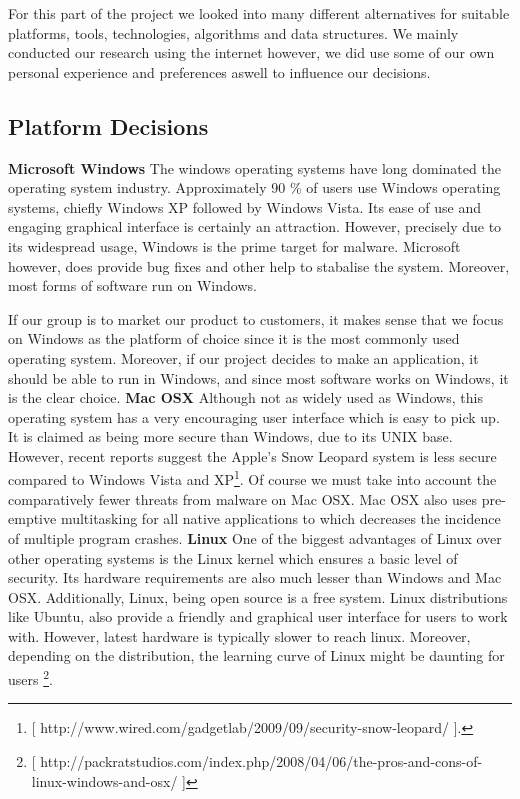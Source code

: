 
For this part of the project we looked into many different alternatives for suitable platforms,
tools, technologies, algorithms and data structures. We mainly conducted our research using the internet however, 
we did use some of our own personal experience and preferences aswell to influence our decisions.

\subsection{Platform Decisions}
\vspace{5 mm}
\textbf{Microsoft Windows}
\newline
\newline
The windows operating systems have long dominated the operating system industry. Approximately 90 \% of users use Windows operating systems, chiefly Windows XP followed by Windows Vista. Its ease of use and engaging graphical interface is certainly an attraction. However, precisely due to its widespread usage, Windows is the prime target for malware. Microsoft however, does provide bug fixes and other help to stabalise the system. Moreover, most forms of software run on Windows.

If our group is to market our product to customers, it makes sense that we focus on Windows as the platform of choice since it is the most commonly used operating system. Moreover, if our project decides to make an application, it should be able to run in Windows, and since most software works on Windows, it is the clear choice.
\newline
\newline
\textbf{Mac OSX}
\newline
\newline
Although not as widely used as Windows, this operating system has a very encouraging user interface which is easy to pick up. It is claimed as being more secure than Windows, due to its UNIX base. However, recent reports suggest the Apple’s Snow Leopard system is less secure compared to Windows Vista and XP\footnote{ [ http://www.wired.com/gadgetlab/2009/09/security-snow-leopard/ ].}. Of course we must take into account the comparatively fewer threats from malware on Mac OSX. 
Mac OSX also uses pre-emptive multitasking for all native applications to which decreases the incidence of multiple program crashes.
\newline
\newline
\textbf{Linux}
\newline
\newline
One of the biggest advantages of Linux over other operating systems is the Linux kernel which ensures a basic level of security. Its hardware requirements are also much lesser than Windows and Mac OSX. Additionally, Linux, being open source is a free system. Linux distributions like Ubuntu, also provide a friendly and graphical user interface for users to work with. However, latest hardware is typically slower to reach linux. Moreover, depending on the distribution, the learning curve of Linux might be daunting for users \footnote{[ http://packratstudios.com/index.php/2008/04/06/the-pros-and-cons-of-linux-windows-and-osx/ ]}.

